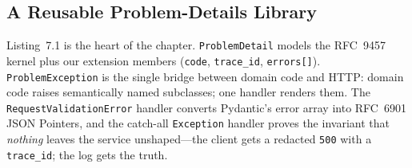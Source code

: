\subsection{A Reusable Problem-Details Library}

Listing~7.1 is the heart of the chapter. \texttt{ProblemDetail} models the
RFC~9457 kernel plus our extension members (\texttt{code},
\texttt{trace\_id}, \texttt{errors[]}). \texttt{ProblemException} is the
single bridge between domain code and HTTP: domain code raises semantically
named subclasses; one handler renders them. The
\texttt{RequestValidationError} handler converts Pydantic's error array into
RFC~6901 JSON Pointers, and the catch-all \texttt{Exception} handler proves
the invariant that \emph{nothing} leaves the service unshaped---the client
gets a redacted \texttt{500} with a \texttt{trace\_id}; the log gets the
truth.

